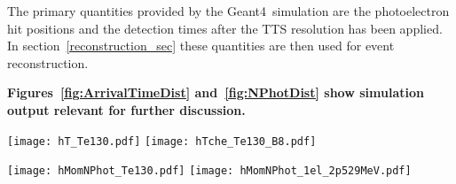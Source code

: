 The primary
quantities provided by the Geant4~simulation are the photoelectron hit
positions and the detection times after the TTS resolution has been
applied. In section~\ref{reconstruction_sec} these quantities are then
used for event reconstruction.




{\bf Figures~\ref{fig:ArrivalTimeDist} and~\ref{fig:NPhotDist} show simulation
output relevant for further discussion.}

\begin{figure*}[ht]
  \centering
  \texttt{[image: hT\_Te130.pdf]}
  \texttt{[image: hTche\_Te130\_B8.pdf]}
  \caption{\emph{Left:} Photo-electron (PE) arrival times after
    application of the photo-detector transit time spread (TTS) of
    100~ps for the simulation of 1000 0{\nbb} decay events of
    $^{130}$Te at the center of the detector. PEs from Cherenkov light
    (\emph{dashed red line}) and scintillation light (\emph{solid blue
      line}) are compared. The black vertical line illustrates a time
    cut at 33.5 ns. \emph{Right:} Comparison between Cherenkov PEs
    arrival time for $^{130}$Te {0\nbb} decay (\emph{solid line}) and
    $^{8}$B (\emph{dotted line}) events. {\bf Distributions of the
      scintillation PEs arrival time are indistinguishable between
      $^{130}$Te 0{\nbb} decay and $^8$B due to identical total energy
      in the event, $Q(^{130}{\rm Te})=2.526$~MeV.} }
\label{fig:ArrivalTimeDist}
\end{figure*}


\begin{figure*}[ht]
  \centering
  \texttt{[image: hMomNPhot\_Te130.pdf]}
  \texttt{[image: hMomNPhot\_1el\_2p529MeV.pdf]}
  \caption{Number of Cherenkov (\emph{dashed red line}), scintillation
    (\emph{dotted blue line}), and total (\emph{solid black line}) PEs
    for the simulation of 1000 $^{130}$Te 0{\nbb} decay (left panel)
    and $^8$B (\emph{right panel}) events.}
\label{fig:NPhotDist}
\end{figure*}

